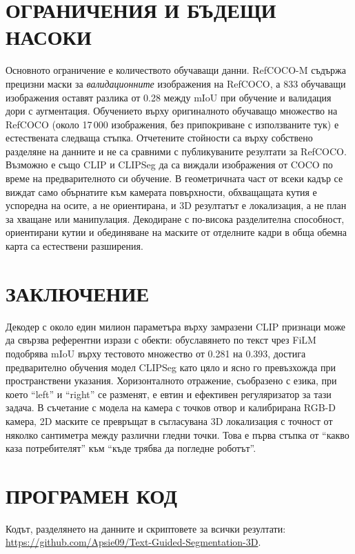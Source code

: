 \documentclass[conference,a4paper]{IEEEtran}
\newcommand{\bgsc}[2]{\texorpdfstring{#1{\footnotesize\MakeUppercase{#2}}}{#1#2}}
\newcommand{\en}[1]{\enquote{#1}}
\begin{document}
\section{\bgsc{О}{граничения и бъдещи насоки}}
\label{sec:limitations}

Основното ограничение е количеството обучаващи данни. RefCOCO-M съдържа прецизни маски за
\emph{валидационните} изображения на RefCOCO, а 833 обучаващи изображения оставят разлика от 0.28
между mIoU при обучение и валидация дори с аугментация. Обучението върху оригиналното обучаващо
множество на RefCOCO (около 17\,000 изображения, без припокриване с използваните тук) е естествената
следваща стъпка. Отчетените стойности са върху собствено разделяне на данните и не са сравними с
публикуваните резултати за RefCOCO. Възможно е също CLIP и CLIPSeg да са виждали изображения от COCO
по време на предварителното си обучение. В геометричната част от всеки кадър се виждат само обърнатите към камерата повърхности, обхващащата кутия е успоредна на осите, а не ориентирана, и 3D резултатът е
локализация, а не план за хващане или манипулация. Декодиране с по-висока разделителна способност,
ориентирани кутии и обединяване на маските от отделните кадри в обща обемна карта са естествени
разширения.

\section{\bgsc{З}{аключение}}
\label{sec:conclusion}

Декодер с около един милион параметъра върху замразени CLIP признаци може да свързва референтни
изрази с обекти: обуславянето по текст чрез FiLM подобрява mIoU върху тестовото множество от 0.281 на
0.393, достига предварително обучения модел CLIPSeg като цяло и ясно го превъзхожда при
пространствени указания. Хоризонталното отражение, съобразено с езика, при което \en{left} и
\en{right} се разменят, е евтин и ефективен регуляризатор за тази задача. В съчетание с модела на
камера с точков отвор и калибрирана RGB-D камера, 2D маските се превръщат в съгласувана 3D
локализация с точност от няколко сантиметра между различни гледни точки. Това е първа стъпка от
\enquote{какво каза потребителят} към \enquote{къде трябва да погледне роботът}.

\section*{\bgsc{П}{рограмен код}}

Кодът, разделянето на данните и скриптовете за всички резултати:
\url{https://github.com/Apsie09/Text-Guided-Segmentation-3D}.



\end{document}
